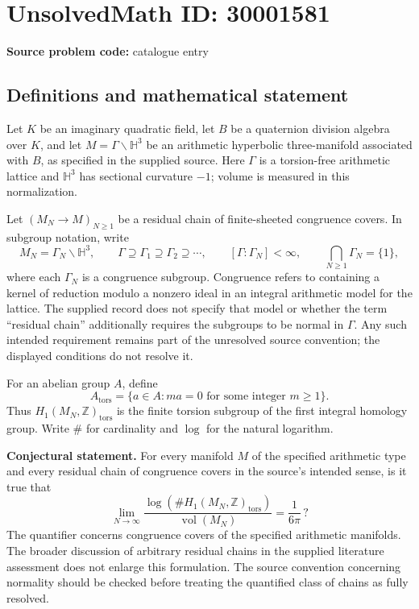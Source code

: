 \documentclass[11pt]{article}
\begin{document}
\section*{UnsolvedMath ID: 30001581}
\textbf{Source problem code:} catalogue entry
\subsection{Definitions and mathematical statement}
Let \(K\) be an imaginary quadratic field, let \(B\) be a quaternion division algebra over \(K\), and let \(M=\Gamma\backslash\mathbb H^3\) be an arithmetic hyperbolic three-manifold associated with \(B\), as specified in the supplied source. Here \(\Gamma\) is a torsion-free arithmetic lattice and \(\mathbb H^3\) has sectional curvature \(-1\); volume is measured in this normalization.

Let \((M_N\to M)_{N\geq 1}\) be a residual chain of finite-sheeted congruence covers. In subgroup notation, write
\[
M_N=\Gamma_N\backslash\mathbb H^3,\qquad
\Gamma\supseteq\Gamma_1\supseteq\Gamma_2\supseteq\cdots,\qquad
[\Gamma:\Gamma_N]<\infty,\qquad
\bigcap_{N\geq1}\Gamma_N=\{1\},
\]
where each \(\Gamma_N\) is a congruence subgroup. Congruence refers to containing a kernel of reduction modulo a nonzero ideal in an integral arithmetic model for the lattice. The supplied record does not specify that model or whether the term ``residual chain'' additionally requires the subgroups to be normal in \(\Gamma\). Any such intended requirement remains part of the unresolved source convention; the displayed conditions do not resolve it.

For an abelian group \(A\), define
\[
A_{\mathrm{tors}}=\{a\in A: ma=0\text{ for some integer }m\geq1\}.
\]
Thus \(H_1(M_N,\mathbb Z)_{\mathrm{tors}}\) is the finite torsion subgroup of the first integral homology group. Write \(\#\) for cardinality and \(\log\) for the natural logarithm.

\textbf{Conjectural statement.} For every manifold \(M\) of the specified arithmetic type and every residual chain of congruence covers in the source's intended sense, is it true that
\[
\lim_{N\to\infty}
\frac{\log\!\left(\#H_1(M_N,\mathbb Z)_{\mathrm{tors}}\right)}
{\operatorname{vol}(M_N)}
=\frac{1}{6\pi}\,?
\]
The quantifier concerns congruence covers of the specified arithmetic manifolds. The broader discussion of arbitrary residual chains in the supplied literature assessment does not enlarge this formulation. The source convention concerning normality should be checked before treating the quantified class of chains as fully resolved.
\end{document}
